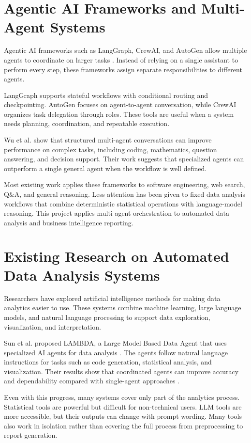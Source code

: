 \documentclass[12pt,a4paper,openany]{report}
\begin{document}
\section{Agentic AI Frameworks and Multi-Agent Systems}
Agentic AI frameworks such as LangGraph, CrewAI, and AutoGen allow multiple agents to coordinate on larger tasks \cite{langchain2024, wu2023}. Instead of relying on a single assistant to perform every step, these frameworks assign separate responsibilities to different agents.

LangGraph supports stateful workflows with conditional routing and checkpointing. AutoGen focuses on agent-to-agent conversation, while CrewAI organizes task delegation through roles. These tools are useful when a system needs planning, coordination, and repeatable execution.

Wu et al. \cite{wu2023} show that structured multi-agent conversations can improve performance on complex tasks, including coding, mathematics, question answering, and decision support. Their work suggests that specialized agents can outperform a single general agent when the workflow is well defined.

Most existing work applies these frameworks to software engineering, web search, Q\&A, and general reasoning. Less attention has been given to fixed data analysis workflows that combine deterministic statistical operations with language-model reasoning. This project applies multi-agent orchestration to automated data analysis and business intelligence reporting.

\section{Existing Research on Automated Data Analysis Systems}
Researchers have explored artificial intelligence methods for making data analytics easier to use. These systems combine machine learning, large language models, and natural language processing to support data exploration, visualization, and interpretation.

Sun et al. proposed LAMBDA, a Large Model Based Data Agent that uses specialized AI agents for data analysis \cite{sun2024}. The agents follow natural language instructions for tasks such as code generation, statistical analysis, and visualization. Their results show that coordinated agents can improve accuracy and dependability compared with single-agent approaches \cite{sun2024}.

Even with this progress, many systems cover only part of the analytics process. Statistical tools are powerful but difficult for non-technical users. LLM tools are more accessible, but their outputs can change with prompt wording. Many tools also work in isolation rather than covering the full process from preprocessing to report generation.
\end{document}
